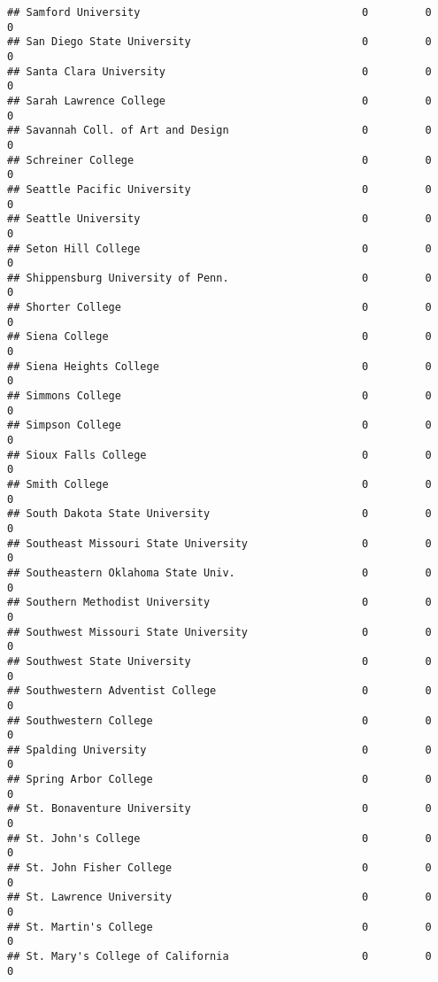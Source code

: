 \documentclass[
]{article}
\begin{document}
\begin{verbatim}
## Samford University                                   0         0           0
## San Diego State University                           0         0           0
## Santa Clara University                               0         0           0
## Sarah Lawrence College                               0         0           0
## Savannah Coll. of Art and Design                     0         0           0
## Schreiner College                                    0         0           0
## Seattle Pacific University                           0         0           0
## Seattle University                                   0         0           0
## Seton Hill College                                   0         0           0
## Shippensburg University of Penn.                     0         0           0
## Shorter College                                      0         0           0
## Siena College                                        0         0           0
## Siena Heights College                                0         0           0
## Simmons College                                      0         0           0
## Simpson College                                      0         0           0
## Sioux Falls College                                  0         0           0
## Smith College                                        0         0           0
## South Dakota State University                        0         0           0
## Southeast Missouri State University                  0         0           0
## Southeastern Oklahoma State Univ.                    0         0           0
## Southern Methodist University                        0         0           0
## Southwest Missouri State University                  0         0           0
## Southwest State University                           0         0           0
## Southwestern Adventist College                       0         0           0
## Southwestern College                                 0         0           0
## Spalding University                                  0         0           0
## Spring Arbor College                                 0         0           0
## St. Bonaventure University                           0         0           0
## St. John's College                                   0         0           0
## St. John Fisher College                              0         0           0
## St. Lawrence University                              0         0           0
## St. Martin's College                                 0         0           0
## St. Mary's College of California                     0         0           0

\end{verbatim}
\end{document}
